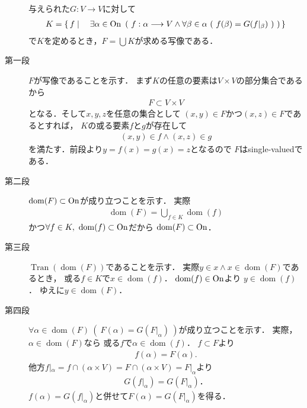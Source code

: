 	\begin{prf}\mbox{}
		\begin{description}
			\item[] 与えられた$G:V \longrightarrow V$に対して
				\begin{align}
					K = \left\{\, f \mid \quad \exists \alpha \in \mathrm{On}\ \left(\ f:\alpha \longrightarrow V \wedge \forall \beta \in \alpha\ (\ f(\beta) = G(f|_\beta)\ )\ \right)\, \right\}
				\end{align}
				で$K$を定めるとき，$F = \bigcup K$が求める写像である．
				
			\item[第一段] $F$が写像であることを示す．
				まず$K$の任意の要素は$V \times V$の部分集合であるから
				\begin{align}
					F \subset V \times V
				\end{align}
				となる．そして$x,y,z$を任意の集合として
				$(x,y) \in F$かつ$(x,z) \in F$であるとすれば，
				$K$の或る要素$f$と$g$が存在して
				\begin{align}
					(x,y) \in f \wedge (x,z) \in g
				\end{align}
				を満たす．前段より$y = f(x) = g(x) = z$となるので
				$F$はsingle-valuedである．
			
			\item[第二段] $\operatorname{dom}(F) \subset \mathrm{On}$が成り立つことを示す．
				実際
				\begin{align}
					\operatorname{dom}(F) = \bigcup_{f \in K} \operatorname{dom}(f)
				\end{align}
				かつ$\forall f \in K,\ \operatorname{dom}(f) \subset \mathrm{On}$だから
				$\operatorname{dom}(F) \subset \mathrm{On}$．
				
			\item[第三段] $\operatorname{Tran}(\operatorname{dom}(F))$であることを示す．
				実際$y \in x \wedge x \in \operatorname{dom}(F)$であるとき，
				或る$f \in K$で$x \in \operatorname{dom}(f)$．
				$\operatorname{dom}(f) \in \mathrm{On}$より
				$y \in \operatorname{dom}(f)$．
				ゆえに$y \in \operatorname{dom}(F)$．
				
			\item[第四段] $\forall \alpha \in \operatorname{dom}(F)\ (\ F(\alpha) = G(F|_\alpha)\ )$が成り立つことを示す．
				実際，$\alpha \in \operatorname*{dom}(F)$なら
				或る$f$で$\alpha \in \operatorname*{dom}(f)$．
				$f \subset F$より
				\begin{align}
					f(\alpha) = F(\alpha).
				\end{align}
				他方$f|_\alpha = f \cap (\alpha \times V)
				= F \cap (\alpha \times V) = F|_\alpha$より
				\begin{align}
					G(f|_\alpha) = G(F|_\alpha)．
				\end{align}
				$f(\alpha) = G(f|_\alpha)$と併せて$F(\alpha) = G(F|_\alpha)$を得る．
			

\end{description}
\end{prf}
